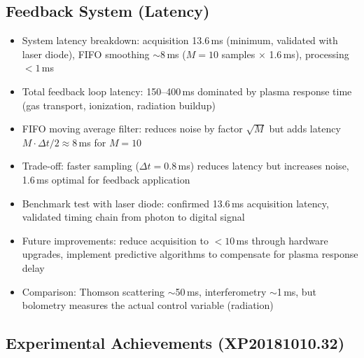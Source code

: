 \documentclass[11pt,a4paper]{article}
\begin{document}
\subsection{Feedback System (Latency)}

\begin{itemize}
\item System latency breakdown: acquisition 13.6\,ms (minimum, validated with laser diode), FIFO smoothing $\sim$8\,ms ($M=10$ samples $\times$ 1.6\,ms), processing $<1$\,ms
\item Total feedback loop latency: 150--400\,ms dominated by plasma response time (gas transport, ionization, radiation buildup)
\item FIFO moving average filter: reduces noise by factor $\sqrt{M}$ but adds latency $M\cdot\Delta t/2 \approx 8$\,ms for $M=10$
\item Trade-off: faster sampling ($\Delta t=0.8$\,ms) reduces latency but increases noise, 1.6\,ms optimal for feedback application
\item Benchmark test with laser diode: confirmed 13.6\,ms acquisition latency, validated timing chain from photon to digital signal
\item Future improvements: reduce acquisition to $<10$\,ms through hardware upgrades, implement predictive algorithms to compensate for plasma response delay
\item Comparison: Thomson scattering $\sim$50\,ms, interferometry $\sim$1\,ms, but bolometry measures the actual control variable (radiation)
\end{itemize}

\subsection{Experimental Achievements (XP20181010.32)}
\end{document}
